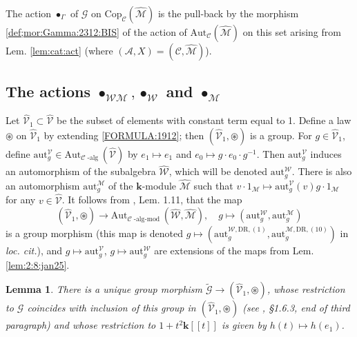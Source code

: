 \documentclass[10pt]{amsart}
\newcommand{\DR}{\mathrm{DR}}
\newtheorem{lem}[thm]{Lemma}
\numberwithin{equation}{subsection}
\begin{document}
\begin{defn}\label{def32:1009}
The action $\bullet_\Gamma$ of $\mathcal G$ on $\mathrm{Cop}_{\mathcal C}(\hat{\mathcal M})$ is the pull-back by the morphism  
\eqref{def;mor:Gamma:2312:BIS} of the action of 
$\mathrm{Aut}_{\mathcal C}(\hat{\mathcal M})$ on this set arising from Lem. 
\ref{lem:cat:act} (where $(\mathcal A,X)=(\mathcal C,\hat{\mathcal M})$).  
\end{defn}

\subsection{The actions $\bullet_{\mathcal{WM}},\bullet_{\mathcal W}$ and $\bullet_{\mathcal M}$}
\label{sect:3:4:5786}

Let $\hat{\mathcal V}_1\subset \hat{\mathcal V}$ be the subset of elements with constant term equal to 1. Define a law 
$\circledast$ on $\hat{\mathcal V}_1$ by extending \eqref{FORMULA:1912}; then $(\hat{\mathcal V}_1,\circledast)$ is a group. 
For $g\in \hat{\mathcal V}_1$, define $\mathrm{aut}^{\mathcal V}_g\in\mathrm{Aut}_{\mathcal C\operatorname{-alg}}(\hat{\mathcal V})$ by 
$e_1\mapsto e_1$ and $e_0\mapsto g\cdot e_0\cdot g^{-1}$. Then $\mathrm{aut}^{\mathcal V}_g$ induces an automorphism of the subalgebra 
$\hat{\mathcal W}$, which will be denoted $\mathrm{aut}^{\mathcal W}_g$. There is also an automorphism $\mathrm{aut}^{\mathcal M}_g$
of the $\mathbf k$-module $\hat{\mathcal M}$ such that $v\cdot 1_{\mathcal M}\mapsto \mathrm{aut}^{\mathcal V}_g(v)g
\cdot 1_{\mathcal M}$ for any $v\in\hat{\mathcal V}$. 
It follows from \cite{EF2}, Lem. 1.11, that the map 
\begin{equation}\label{gp:mor:mathcalV:2312:BIS}
(\hat{\mathcal V}_1,\circledast)\to
\mathrm{Aut}_{\mathcal C\operatorname{-alg-mod}}(\hat{\mathcal W},\hat{\mathcal M}), 
\quad 
g\mapsto (\mathrm{aut}^{\mathcal W}_g,\mathrm{aut}^{\mathcal M}_g)   
\end{equation}
is a group morphism (this map is denoted $g\mapsto (\mathrm{aut}^{\mathcal W,\DR,(1)}_g,\mathrm{aut}^{\mathcal M,\DR,(10)}_g)$ in 
{\it loc. cit.}), and $g\mapsto \mathrm{aut}_g^{\mathcal V}$, $g\mapsto \mathrm{aut}_g^{\mathcal W}$
are extensions of the maps from Lem. \ref{lem:2:8:jan25}. 

\begin{lem}\label{lem:can:BIS}
There is a unique group morphism $\tilde{\mathcal G}\to(\hat{\mathcal V}_1,\circledast)$, 
whose restriction to $\mathcal G$ coincides with inclusion of this group in $(\hat{\mathcal V}_1,\circledast)$ 
(see \cite{EF2}, \S1.6.3, end of third paragraph) and whose restriction to $1+t^2\mathbf k[[t]]$ is given by $h(t)\mapsto 
h(e_1)$.  
\end{lem}
\end{document}
